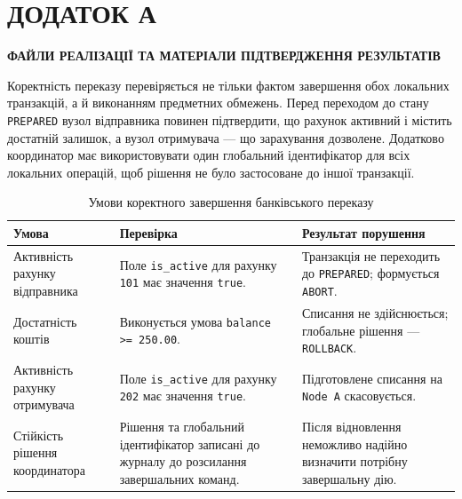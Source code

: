 \clearpage
{}
{}
\section*{ДОДАТОК А}
\begin{center}
\textbf{ФАЙЛИ РЕАЛІЗАЦІЇ ТА МАТЕРІАЛИ ПІДТВЕРДЖЕННЯ РЕЗУЛЬТАТІВ}
\end{center}

\renewcommand{\thetable}{А.\arabic{table}}
\renewcommand{\thelstlisting}{А.\arabic{lstlisting}}
\setcounter{table}{0}
\setcounter{lstlisting}{0}


Коректність переказу перевіряється не тільки фактом завершення обох локальних транзакцій, а й виконанням предметних обмежень. Перед переходом до стану \texttt{PREPARED} вузол відправника повинен підтвердити, що рахунок активний і містить достатній залишок, а вузол отримувача --- що зарахування дозволене. Додатково координатор має використовувати один глобальний ідентифікатор для всіх локальних операцій, щоб рішення не було застосоване до іншої транзакції.

\begin{table}[htbp]
\centering
\caption{Умови коректного завершення банківського переказу}
\label{tab:integrity-conditions}
\fontsize{11pt}{13pt}\selectfont
\setlength{\tabcolsep}{4pt}
\renewcommand{\arraystretch}{1.16}
\begin{tabularx}{\textwidth}{|>{\RaggedRight\arraybackslash}p{}|
                               >{\RaggedRight\arraybackslash}p{}|
                               Y|}
\hline
\textbf{Умова} & \textbf{Перевірка} & \textbf{Результат порушення} \\
\hline
Активність рахунку відправника & Поле \texttt{is\_active} для рахунку \texttt{101} має значення \texttt{true}. & Транзакція не переходить до \texttt{PREPARED}; формується \texttt{ABORT}. \\
\hline
Достатність коштів & Виконується умова \texttt{balance >= 250.00}. & Списання не здійснюється; глобальне рішення --- \texttt{ROLLBACK}. \\
\hline
Активність рахунку отримувача & Поле \texttt{is\_active} для рахунку \texttt{202} має значення \texttt{true}. & Підготовлене списання на \texttt{Node A} скасовується. \\
\hline
Стійкість рішення координатора & Рішення та глобальний ідентифікатор записані до журналу до розсилання завершальних команд. & Після відновлення неможливо надійно визначити потрібну завершальну дію. \\
\hline
\end{tabularx}
\end{table}

